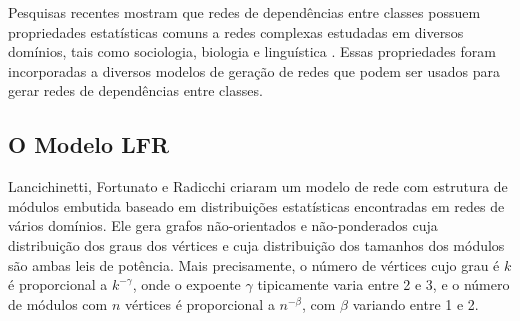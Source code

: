 \documentclass{acm_proc_article-sp}
\begin{document}
Pesquisas recentes mostram que redes de dependências entre classes possuem propriedades estatísticas comuns a redes complexas estudadas em diversos domínios, tais como sociologia, biologia e linguística \cite{Myers2003,Valverde2003}. Essas propriedades foram incorporadas a diversos modelos de geração de redes \cite{Bollobas2003,Lancichinetti2008} que podem ser usados para gerar redes de dependências entre classes. 

%
%
%
%

\subsection{O Modelo LFR}

Lancichinetti, Fortunato e Radicchi \cite{Lancichinetti2008} criaram um modelo de rede com estrutura de módulos embutida baseado em distribuições estatísticas encontradas em redes de vários domínios. Ele gera grafos não-orientados e não-ponderados cuja distribuição dos graus dos vértices e cuja distribuição dos tamanhos dos módulos são ambas leis de potência. Mais precisamente, o número de vértices cujo grau é $k$ é proporcional a $k^{-\gamma}$, onde o expoente $\gamma$ tipicamente varia entre 2 e 3, e o número de módulos com $n$ vértices é proporcional a $n^{-\beta}$, com $\beta$ variando entre 1 e 2.
\end{document}
